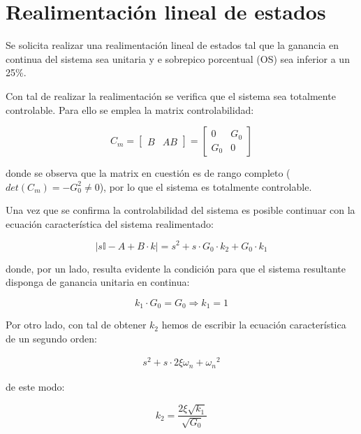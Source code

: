 \section{Realimentación lineal de estados}

Se solicita realizar una realimentación lineal de estados tal que la ganancia en continua del sistema sea unitaria y e sobrepico porcentual (OS) sea inferior a un 25\%.

Con tal de realizar la realimentación se verifica que el sistema sea totalmente controlable. Para ello se emplea la matrix controlabilidad:

\begin{equation}
    C_m = \begin{bmatrix} 
        B & AB 
    \end{bmatrix} = 
    \begin{bmatrix}
        0 & G_0 \\ G_0 & 0
    \end{bmatrix}
\end{equation}

\noindent donde se observa que la matrix en cuestión es de rango completo ($det(C_m) = -G_0^2 \neq 0$), por lo que el sistema es totalmente controlable. 

Una vez que se confirma la controlabilidad del sistema es posible continuar con la ecuación característica del sistema realimentado:

\begin{equation}
    |s\mathbb{I} - A + B \cdot k| = s^2 + s \cdot G_0 \cdot k_2 + G_0 \cdot k_1
\end{equation}

\noindent donde, por un lado, resulta evidente la condición para que el sistema resultante disponga de ganancia unitaria en continua:

\begin{equation}
    k_1 \cdot G_0 = G_0 \Longrightarrow \boxed{k_1 = 1}
\end{equation}

\noindent Por otro lado, con tal de obtener $k_2$ hemos de escribir la ecuación característica de un segundo orden:

\begin{align*}
    s^2 + s \cdot 2\xi \omega_n + {\omega_n}^2
\end{align*}


\noindent de este modo:

\begin{equation}
    k_2 = \frac{2\xi \sqrt{k_1}}{\sqrt{G_0}}
\end{equation}


